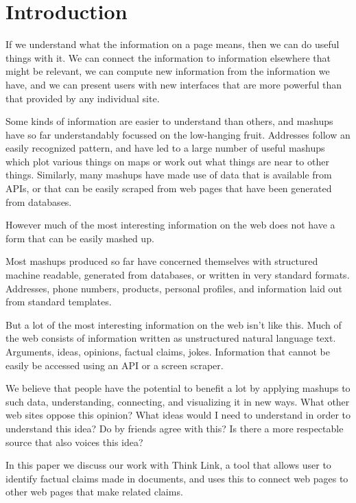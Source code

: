 \documentclass{chi2009}
\begin{document}
\section{Introduction}

If we understand what the information on a page means, then we can do useful things with it. We can connect the information to information elsewhere that might be relevant, we can compute new information from the information we have, and we can present users with new interfaces that are more powerful than that provided by any individual site.

Some kinds of information are easier to understand than others, and mashups have so far understandably focussed on the low-hanging fruit. Addresses follow an easily recognized pattern, and have led to a large number of useful mashups which plot various things on maps or work out what things are near to other things. Similarly, many mashups have made use of data that is available from APIs, or that can be easily scraped from web pages that have been generated from databases.

However much of the most interesting information on the web does not have a form that can be easily mashed up. 

Most mashups produced so far have concerned themselves with structured machine readable, generated from databases, or written in very standard formats. Addresses, phone numbers, products, personal profiles, and information laid out from standard templates. 

But a lot of the most interesting information on the web isn't like this. Much of the web consists of information written as unstructured natural language text. Arguments, ideas, opinions, factual claims, jokes. Information that cannot be easily be accessed using an API or a screen scraper.

We believe that people have the potential to benefit a lot by applying mashups to such data, understanding, connecting, and visualizing it in new ways. What other web sites oppose this opinion? What ideas would I need to understand in order to understand this idea? Do by friends agree with this? Is there a more respectable source that also voices this idea?

In this paper we discuss our work with Think Link, a tool that allows user to identify factual claims made in documents, and uses this to connect web pages to other web pages that make related claims.
\end{document}
